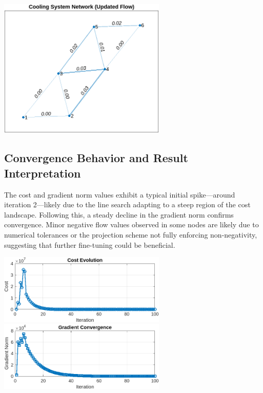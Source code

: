 \documentclass{article}
\begin{document}
\begin{center}
\includegraphics[width=0.6\textwidth]{images/final flow.png}
\end{center}


\subsection{Convergence Behavior and Result Interpretation}
The cost and gradient norm values exhibit a typical initial spike—around iteration 2—likely due to the line search adapting to a steep region of the cost landscape. Following this, a steady decline in the gradient norm confirms convergence. Minor negative flow values observed in some nodes are likely due to numerical tolerances or the projection scheme not fully enforcing non-negativity, suggesting that further fine-tuning could be beneficial.


\begin{center}
\includegraphics[width=0.6\textwidth]{images/gradient convergence.png}
\includegraphics[width=0.6\textwidth]{images/gradient convergence (1).png}
\end{center}
\end{document}
